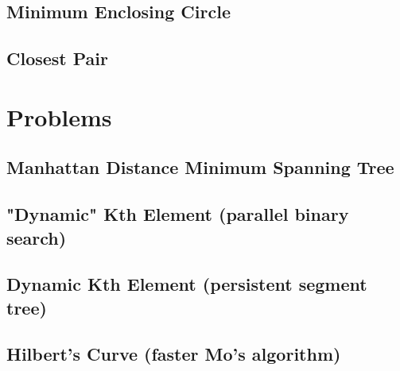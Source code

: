 \documentclass[a4paper,10pt,twocolumn,oneside]{article}
\begin{document}
\subsection{Minimum Enclosing Circle}

\subsection{Closest Pair}

\section{Problems}
\subsection{Manhattan Distance Minimum Spanning Tree}

\subsection{"Dynamic" Kth Element (parallel binary search)}

\subsection{Dynamic Kth Element (persistent segment tree)}

\subsection{Hilbert's Curve (faster Mo's algorithm)}

\end{document}
